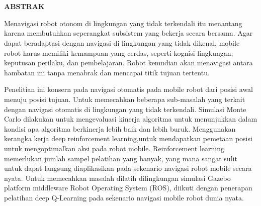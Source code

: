 \chapter*{}
\vspace*{-1.0cm}
\begin{center}
\normalfont\LARGE\textbf{ABSTRAK}
\end{center}
Menavigasi robot otonom di lingkungan yang tidak terkendali itu menantang karena membutuhkan seperangkat subsistem yang bekerja secara bersama. Agar dapat beradaptasi dengan navigasi di lingkungan yang tidak dikenal, mobile robot harus memiliki kemampuan yang cerdas, seperti kognisi lingkungan, keputusan perilaku, dan pembelajaran. Robot kemudian akan menavigasi antara hambatan ini tanpa menabrak  dan mencapai titik tujuan tertentu.


Penelitian ini konsern pada navigasi otomatis pada mobile robot dari posisi awal menuju posisi tujuan. 
Untuk memecahkan beberapa sub-masalah yang terkait dengan navigasi otomatis di lingkungan yang tidak terkendali. 
Simulasi Monte Carlo dilakukan untuk mengevaluasi kinerja algoritma untuk menunjukkan dalam kondisi apa algoritma  berkinerja lebih baik dan lebih buruk.
Menggunakan kerangka kerja deep reinforcement learning,untuk mendapatkan pemetaan posisi untuk mengoptimalkan aksi pada robot mobile. Reinforcement learning memerlukan jumlah sampel pelatihan yang banyak, yang mana sangat sulit untuk dapat langsung diaplikasikan pada sekenario navigasi robot mobile secara nyata. Untuk memecahkan masalah  dilatih dilingkungan simulasi Gazebo platform middleware Robot Operating System (ROS), diikuti dengan penerapan pelatihan deep Q-Learning pada sekenario navigasi mobile robot dunia nyata.


